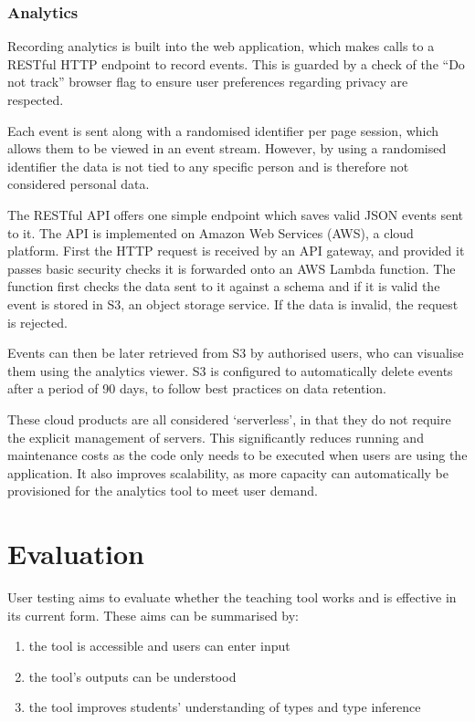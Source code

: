 \documentclass[a4paper,fleqn,12pt]{article}
\begin{document}
\subsubsection{Analytics}\label{id:h.39bhrrv1fi5p}
Recording analytics is built into the web application, which makes calls to a RESTful HTTP endpoint to record events. This is guarded by a check of the “Do not track” browser flag to ensure user preferences regarding privacy are respected.

Each event is sent along with a randomised identifier per page session, which allows them to be viewed in an event stream. However, by using a randomised identifier the data is not tied to any specific person and is therefore not considered personal data.

The RESTful API offers one simple endpoint which saves valid JSON events sent to it. The API is implemented on Amazon Web Services (AWS), a cloud platform. First the HTTP request is received by an API gateway, and provided it passes basic security checks it is forwarded onto an AWS Lambda function. The function first checks the data sent to it against a schema and if it is valid the event is stored in S3, an object storage service. If the data is invalid, the request is rejected.

Events can then be later retrieved from S3 by authorised users, who can visualise them using the analytics viewer. S3 is configured to automatically delete events after a period of 90 days, to follow best practices on data retention.

These cloud products are all considered ‘serverless’, in that they do not require the explicit management of servers. This significantly reduces running and maintenance costs as the code only needs to be executed when users are using the application. It also improves scalability, as more capacity can automatically be provisioned for the analytics tool to meet user demand.
\section{Evaluation}\label{id:h.e6letww4nhn0}
User testing aims to evaluate whether the teaching tool works and is effective in its current form. These aims can be summarised by:
\begin{enumerate}
  \item the tool is accessible and users can enter input
  \item the tool’s outputs can be understood
  \item the tool improves students’ understanding of types and type inference
\end{enumerate}
\end{document}
